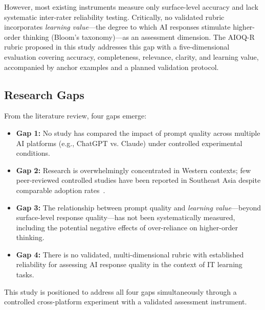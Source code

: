 \documentclass[runningheads]{llncs}
\begin{document}
However, most existing instruments measure only surface-level accuracy and lack systematic inter-rater reliability testing. Critically, no validated rubric incorporates \emph{learning value}---the degree to which AI responses stimulate higher-order thinking (Bloom's taxonomy)---as an assessment dimension. The AIOQ-R rubric proposed in this study addresses this gap with a five-dimensional evaluation covering accuracy, completeness, relevance, clarity, and learning value, accompanied by anchor examples and a planned validation protocol.

\subsection{Research Gaps}

From the literature review, four gaps emerge:

\begin{itemize}
  \item \textbf{Gap 1:} No study has compared the impact of prompt quality across multiple AI platforms (e.g., ChatGPT vs. Claude) under controlled experimental conditions.
  \item \textbf{Gap 2:} Research is overwhelmingly concentrated in Western contexts; few peer-reviewed controlled studies have been reported in Southeast Asia despite comparable adoption rates~\cite{Bui2025}.
  \item \textbf{Gap 3:} The relationship between prompt quality and \emph{learning value}---beyond surface-level response quality---has not been systematically measured, including the potential negative effects of over-reliance on higher-order thinking.
  \item \textbf{Gap 4:} There is no validated, multi-dimensional rubric with established reliability for assessing AI response quality in the context of IT learning tasks.
\end{itemize}

This study is positioned to address all four gaps simultaneously through a controlled cross-platform experiment with a validated assessment instrument.
\end{document}

